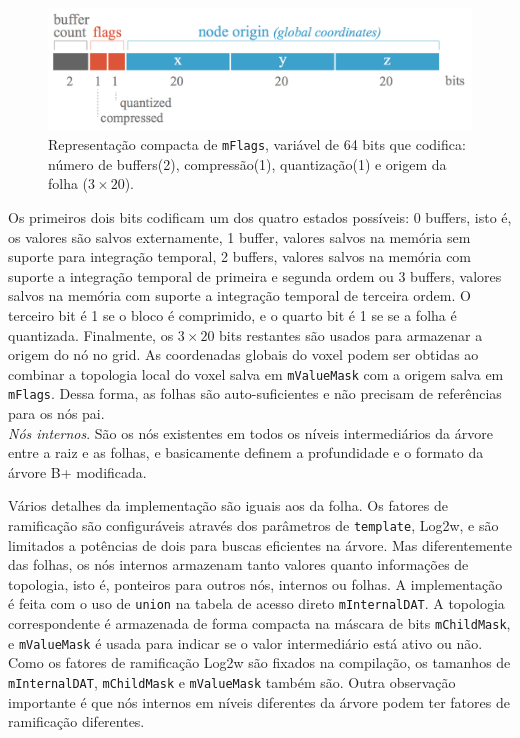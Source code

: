 \documentclass[12pt, a4paper, oneside]{book}
\begin{document}
\begin{figure}[!htb]
\center
\includegraphics[width=12cm]{mFlags}
\caption{Representação compacta de \texttt{mFlags}, variável de 64 bits que codifica: número de buffers(2), compressão(1), quantização(1) e origem da folha ($3 \times 20$).}
\label{mFlags}
\end{figure}

Os primeiros dois bits codificam um dos quatro estados possíveis: 0 buffers, isto é, os valores são salvos externamente, 1 buffer, valores salvos na memória sem suporte para integração temporal, 2 buffers, valores salvos na memória com suporte a integração temporal de primeira e segunda ordem ou 3 buffers, valores salvos na memória com suporte a integração temporal de terceira ordem. O terceiro bit é 1 se o bloco é comprimido, e o quarto bit é 1 se se a folha é quantizada. Finalmente, os $3 \times 20$ bits restantes são usados para armazenar a origem do nó no grid. As coordenadas globais do voxel podem ser obtidas ao combinar a topologia local do voxel salva em \texttt{mValueMask} com a origem salva em \texttt{mFlags}. Dessa forma, as folhas são auto-suficientes e não precisam de referências para os nós pai. \\

\emph{Nós internos}. São os nós existentes em todos os níveis intermediários da árvore entre a raiz e as folhas, e basicamente definem a profundidade e o formato da árvore B+ modificada.  



Vários detalhes da implementação são iguais aos da folha. Os fatores de ramificação são configuráveis através dos parâmetros de \texttt{template}, Log2w, e são limitados a potências de dois para buscas eficientes na árvore. Mas diferentemente das folhas, os nós internos armazenam tanto valores quanto informações de topologia, isto é, ponteiros para outros nós, internos ou folhas. A implementação é feita com o uso de \texttt{union} na tabela de acesso direto \texttt{mInternalDAT}. A topologia correspondente é armazenada de forma compacta na máscara de bits \texttt{mChildMask}, e \texttt{mValueMask} é usada para indicar se o valor intermediário está ativo ou não. Como os fatores de ramificação Log2w são fixados na compilação, os tamanhos de \texttt{mInternalDAT}, \texttt{mChildMask} e \texttt{mValueMask} também são. Outra observação importante é que nós internos em níveis diferentes da árvore podem ter fatores de ramificação diferentes. \\
\end{document}
